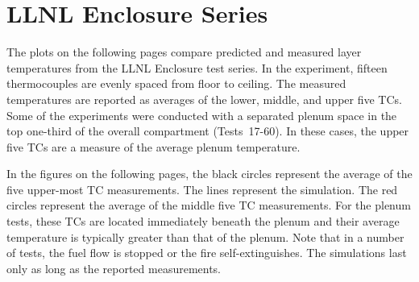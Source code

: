 \clearpage


\section{LLNL Enclosure Series}

The plots on the following pages compare predicted and measured layer temperatures from the LLNL Enclosure test series. 
In the experiment, fifteen thermocouples are evenly spaced from floor to ceiling.
The measured temperatures are reported as averages of the lower, middle, and upper five TCs. 
Some of the experiments were conducted with a separated plenum space in the top one-third of the overall compartment (Tests~17-60). In these cases, the
upper five TCs are a measure of the average plenum temperature. 

In the figures on the following pages, the black circles represent the average of the five upper-most TC measurements. The lines represent the simulation.
The red circles represent the average
of the middle five TC measurements. For the plenum tests, these TCs are located immediately beneath the plenum and their average temperature is typically greater
than that of the plenum. Note that in a number of tests, the fuel flow is stopped or the fire self-extinguishes. The simulations last only as long as the 
reported measurements.

